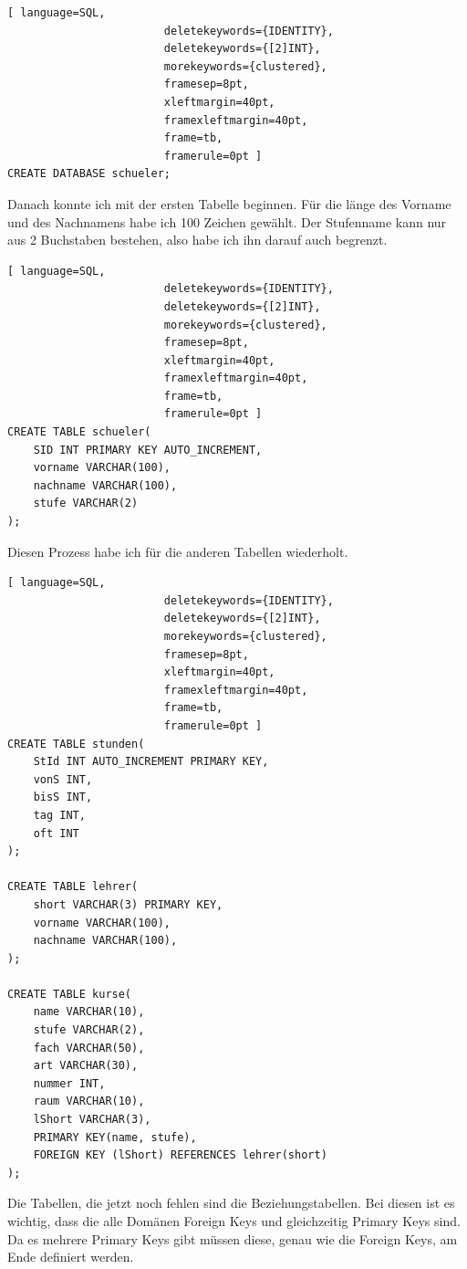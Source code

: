 \documentclass[a4paper, 12pt]{article}
\theoremstyle{plain}
\theoremstyle{definition}
\begin{document}
	\begin{lstlisting}[ language=SQL,
	                    deletekeywords={IDENTITY},
	                    deletekeywords={[2]INT},
	                    morekeywords={clustered},
	                    framesep=8pt,
	                    xleftmargin=40pt,
	                    framexleftmargin=40pt,
	                    frame=tb,
	                    framerule=0pt ]
CREATE DATABASE schueler;
	\end{lstlisting}
Danach konnte ich mit der ersten Tabelle beginnen. Für die länge des Vorname und des Nachnamens habe ich 100 Zeichen gewählt. Der Stufenname kann nur aus 2 Buchstaben bestehen, also habe ich ihn darauf auch begrenzt.
	\begin{lstlisting}[ language=SQL,
	                    deletekeywords={IDENTITY},
	                    deletekeywords={[2]INT},
	                    morekeywords={clustered},
	                    framesep=8pt,
	                    xleftmargin=40pt,
	                    framexleftmargin=40pt,
	                    frame=tb,
	                    framerule=0pt ]
CREATE TABLE schueler(
	SID INT PRIMARY KEY AUTO_INCREMENT, 
	vorname VARCHAR(100), 
	nachname VARCHAR(100), 
	stufe VARCHAR(2)
);
	\end{lstlisting}
Diesen Prozess habe ich für die anderen Tabellen wiederholt.
	
	\begin{lstlisting}[ language=SQL,
	                    deletekeywords={IDENTITY},
	                    deletekeywords={[2]INT},
	                    morekeywords={clustered},
	                    framesep=8pt,
	                    xleftmargin=40pt,
	                    framexleftmargin=40pt,
	                    frame=tb,
	                    framerule=0pt ]
CREATE TABLE stunden(
	StId INT AUTO_INCREMENT PRIMARY KEY, 
	vonS INT, 
	bisS INT, 
	tag INT, 
	oft INT
);

CREATE TABLE lehrer(
	short VARCHAR(3) PRIMARY KEY,
	vorname VARCHAR(100), 
	nachname VARCHAR(100),
);

CREATE TABLE kurse(
	name VARCHAR(10), 
	stufe VARCHAR(2), 
	fach VARCHAR(50), 
	art VARCHAR(30),
	nummer INT,
	raum VARCHAR(10), 
	lShort VARCHAR(3), 
	PRIMARY KEY(name, stufe), 
	FOREIGN KEY (lShort) REFERENCES lehrer(short)
);
	\end{lstlisting}
Die Tabellen, die jetzt noch fehlen sind die Beziehungstabellen. Bei diesen ist es wichtig, dass die alle Domänen Foreign Keys und gleichzeitig Primary Keys sind. Da es mehrere Primary Keys gibt müssen diese, genau wie die Foreign Keys, am Ende definiert werden.
	
\end{document}
